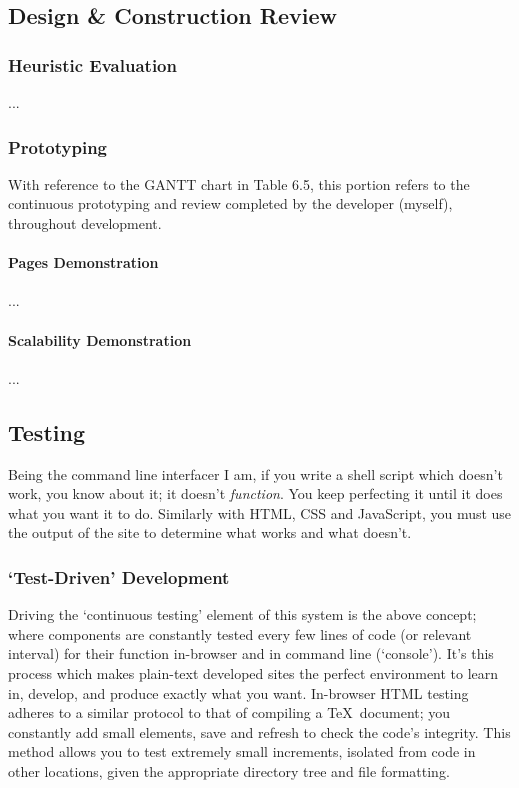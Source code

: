 \documentclass[11pt, english]{article}
\begin{document}
	\subsection{Design \& Construction Review}

		\subsubsection{Heuristic Evaluation}

	...

		\subsubsection{Prototyping}

	With reference to the GANTT chart in Table 6.5, this portion refers to the continuous prototyping and review completed by the developer (myself), throughout development.

			\paragraph{Pages Demonstration}

	...

			\paragraph{Scalability Demonstration}

	...

	\subsection{Testing}

	Being the command line interfacer I am, if you write a shell script which doesn't work, you know about it; it doesn't \textit{function}. You keep perfecting it until it does what you want it to do. Similarly with HTML, CSS and JavaScript, you must use the output of the site to determine what works and what doesn't.

		\subsubsection{`Test-Driven' Development}

	Driving the `continuous testing' element of this system is the above concept; where components are constantly tested every few lines of code (or relevant interval) for their function in-browser and in command line (`console'). It's this process which makes plain-text developed sites the perfect environment to learn in, develop, and produce exactly what you want. In-browser HTML testing adheres to a similar protocol to that of compiling a {\TeX}\ document; you constantly add small elements, save and refresh to check the code's integrity. This method allows you to test extremely small increments, isolated from code in other locations, given the appropriate directory tree and file formatting.\\
\end{document}
